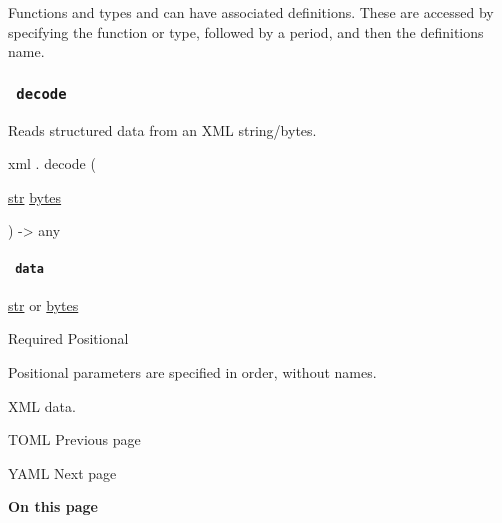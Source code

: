 \label{definitions-tooltip}
Functions and types and can have associated definitions. These are
accessed by specifying the function or type, followed by a period, and
then the definition\textquotesingle s name.

\subsubsection{\texorpdfstring{\texttt{\ decode\ }}{ decode }}\label{definitions-decode}

Reads structured data from an XML string/bytes.

xml { . } { decode } (

{ \href{/docs/reference/foundations/str/}{str}
\href{/docs/reference/foundations/bytes/}{bytes} }

) -\textgreater{} { any }

\paragraph{\texorpdfstring{\texttt{\ data\ }}{ data }}\label{definitions-decode-data}

\href{/docs/reference/foundations/str/}{str} {or}
\href{/docs/reference/foundations/bytes/}{bytes}

{Required} {{ Positional }}

\label{definitions-decode-data-positional-tooltip}
Positional parameters are specified in order, without names.

XML data.

\href{/docs/reference/data-loading/toml/}{\pandocbounded{}}

{ TOML } { Previous page }

\href{/docs/reference/data-loading/yaml/}{\pandocbounded{}}

{ YAML } { Next page }

\textbf{On this page}

